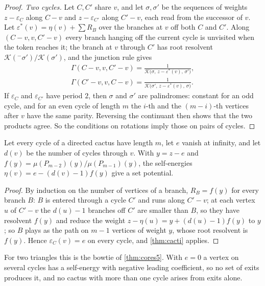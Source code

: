 \documentclass[final]{siamart0516}
\numberwithin{theorem}{section}
\numberwithin{equation}{section}
\theoremstyle{siamnonum}
\theoremstyle{plain}
\newcommand{\cont}{\mathcal{K}}           %
\begin{document}
\begin{proof}
\emph{Two cycles.} Let $C,C'$ share $v$, and let $\sigma,\sigma'$ be the sequences of weights $z-\varepsilon_C$ along $C-v$ and $z-\varepsilon_{C'}$ along $C'-v$, each read from the successor of $v$. Let $\varepsilon^{*}(v)=\eta(v)+\sum R_B$ over the branches at $v$ off both $C$ and $C'$. Along $(C-v,v,C'-v)$ every branch hanging off the current cycle is unvisited when the token reaches it; the branch at $v$ through $C'$ has root resolvent $\cont({}^{-}\sigma')/\cont(\sigma')$, and the junction rule gives
\begin{gather*}
\Gamma(C-v,v,C'-v)=\frac{1}{\cont\bigl(\sigma,\,z-\varepsilon^{*}(v),\,\sigma'\bigr)},\\
\Gamma(C'-v,v,C-v)=\frac{1}{\cont\bigl(\sigma',\,z-\varepsilon^{*}(v),\,\sigma\bigr)}.
\end{gather*}
If $\varepsilon_C$ and $\varepsilon_{C'}$ have period $2$, then $\sigma$ and $\sigma'$ are palindromes: constant for an odd cycle, and for an even cycle of length $m$ the $i$-th and the $(m-i)$-th vertices after $v$ have the same parity. Reversing the continuant then shows that the two products agree. So the conditions on rotations imply those on pairs of cycles.
\end{proof}

\begin{corollary}\label{cor:uniform-cacti}
Let every cycle of a directed cactus have length $m$, let $e$ vanish at infinity, and let $d(v)$ be the number of cycles through $v$. With $y=z-e$ and $f(y)=\mu(P_{m-2})(y)/\mu(P_{m-1})(y)$, the self-energies $\eta(v)=e-(d(v)-1)f(y)$ give a set potential.
\end{corollary}
\begin{proof}
By induction on the number of vertices of a branch, $R_B=f(y)$ for every branch $B$: $B$ is entered through a cycle $C'$ and runs along $C'-v$; at each vertex $u$ of $C'-v$ the $d(u)-1$ branches off $C'$ are smaller than $B$, so they have resolvent $f(y)$ and reduce the weight $z-\eta(u)=y+(d(u)-1)f(y)$ to $y$; so $B$ plays as the path on $m-1$ vertices of weight $y$, whose root resolvent is $f(y)$. Hence $\varepsilon_C(v)=e$ on every cycle, and \cref{thm:cacti} applies.
\end{proof}

For two triangles this is the bowtie of \cref{thm:cores5}. With $e=0$ a vertex on several cycles has a self-energy with negative leading coefficient, so no set of exits produces it, and no cactus with more than one cycle arises from exits alone.
\end{document}
